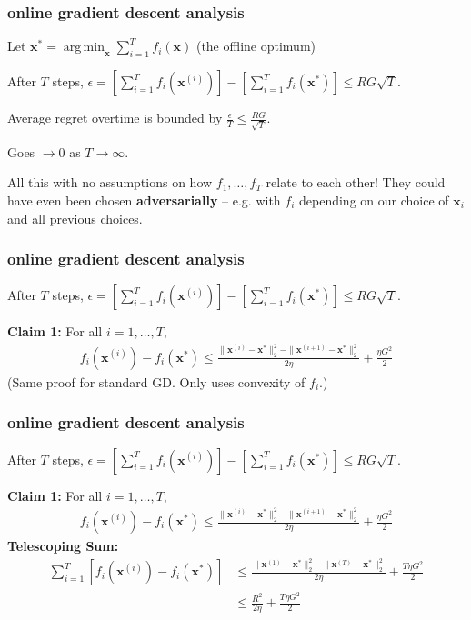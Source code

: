 \documentclass[compress]{beamer}
\newcommand{\bv}[1]{\mathbf{#1}}
\DeclareMathOperator*{\argmin}{arg\,min}
\begin{document}
\begin{frame}[t]
	\frametitle{online gradient descent analysis} 
Let $\bv{x}^{*} = \argmin_\bv{x}\sum_{i=1}^T f_i(\bv{x})$ (the offline optimum)
	\begin{theorem}
		After $T$ steps, $\epsilon = \left[\sum_{i=1}^T f_i(\bv{x}^{(i)})\right] - \left[\sum_{i=1}^T f_i(\bv{x}^*)\right] \leq RG\sqrt{T}$.
	\end{theorem}
	Average regret overtime is bounded by $\frac{\epsilon}{T} \leq \frac{RG}{\sqrt{T}}$.
	
	Goes $\rightarrow 0$ as $T\rightarrow \infty$. 
	
	\begin{center}
		All this with no assumptions on how $f_1, \ldots, f_T$ relate to each other! They could have even been chosen \alert{\textbf{adversarially}} -- e.g. with $f_i$ depending on our choice of $\bv{x}_i$ and all previous choices. 
	\end{center}
\end{frame}

\begin{frame}[t]
	\frametitle{online gradient descent analysis}
	\begin{theorem}
		After $T$ steps, $\epsilon = \left[\sum_{i=1}^T f_i(\bv{x}^{(i)})\right] - \left[\sum_{i=1}^T f_i(\bv{x}^*)\right] \leq RG\sqrt{T}$.
	\end{theorem}
	\textbf{Claim 1:} For all $i = 1, \ldots, T$, 
	\begin{align*}
		f_i(\bv{x}^{(i)}) - f_i(\bv{x}^*) \leq \frac{\|\bv{x}^{(i)} - \bv{x}^*\|_2^2 - \|\bv{x}^{(i+1)} - \bv{x}^*\|_2^2}{2\eta} + \frac{\eta G^2}{2}
	\end{align*}
(Same proof for standard GD. Only uses convexity of $f_i$.)

\end{frame}

\begin{frame}[t]
	\frametitle{online gradient descent analysis}
	\begin{theorem}
		After $T$ steps, $\epsilon = \left[\sum_{i=1}^T f_i(\bv{x}^{(i)})\right] - \left[\sum_{i=1}^T f_i(\bv{x}^*)\right] \leq RG\sqrt{T}$.
	\end{theorem}
	\textbf{Claim 1:} For all $i = 1, \ldots, T$, 
	\begin{align*}
		f_i(\bv{x}^{(i)}) - f_i(\bv{x}^*) \leq \frac{\|\bv{x}^{(i)} - \bv{x}^*\|_2^2 - \|\bv{x}^{(i+1)} - \bv{x}^*\|_2^2}{2\eta} + \frac{\eta G^2}{2}
	\end{align*}
	\textbf{Telescoping Sum:} 
	\begin{align*}
		\sum_{i=1}^{T}\left[f_i(\bv{x}^{(i)}) - f_i(\bv{x}^*)\right] &\leq \frac{\|\bv{x}^{(1)}-\bv{x}^*\|_2^2 -\|\bv{x}^{(T)}-\bv{x}^*\|_2^2}{2\eta} + \frac{T\eta G^2}{2} \\ &\leq  \frac{R^2}{2\eta} + \frac{T\eta G^2}{2}
	\end{align*}
	
	
\end{frame}
\end{document}
